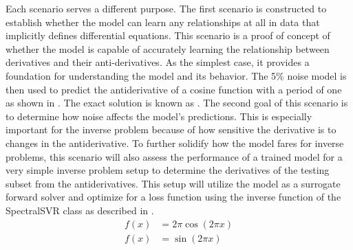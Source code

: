 Each scenario serves a different purpose. The first scenario is constructed to establish whether the model can learn any relationships at all in data that implicitly defines differential equations. This scenario is a proof of concept of whether the model is capable of accurately learning the relationship between derivatives and their anti-derivatives. As the simplest case, it provides a foundation for understanding the model and its behavior. The 5\% noise model is then used to predict the antiderivative of a cosine function with a period of one as shown in . The exact solution is known as  \autocite{abramowitzHandbookMathematicalFunctions1972}. The second goal of this scenario is to determine how noise affects the model's predictions. This is especially important for the inverse problem because of how sensitive the derivative is to changes in the antiderivative. To further solidify how the model fares for inverse problems, this scenario will also assess the performance of a trained model for a very simple inverse problem setup to determine the derivatives of the testing subset from the antiderivatives. This setup will utilize the model as a surrogate forward solver and optimize for a loss function using the inverse function of the SpectralSVR class as described in .
\begin{align}
  f(x) & = 2\pi \cos\left(2\pi x\right)\label{eq:sine_derivative} \\
  f(x) & = \sin\left(2\pi x\right)\label{eq:sine_function}
\end{align}

